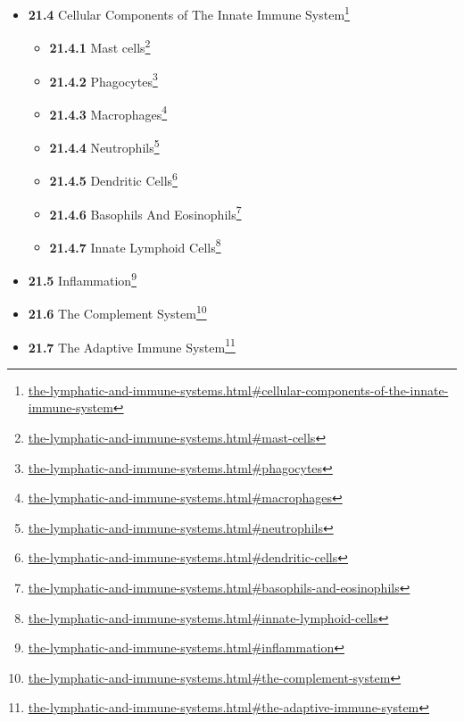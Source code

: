 \documentclass[
]{article}
\providecommand{\tightlist}{%
  \setlength{\itemsep}{0pt}\setlength{\parskip}{0pt}}
\providecommand{\tightlist}{%
  \setlength{\itemsep}{0pt}\setlength{\parskip}{0pt}}
\let\rmarkdownfootnote\footnote%
\def\footnote{\protect\rmarkdownfootnote}
\renewcommand{\href}[2]{#2\footnote{\url{#1}}}
\theoremstyle{definition}
\theoremstyle{definition}
\theoremstyle{definition}
\theoremstyle{remark}
\begin{document}
\begin{itemize}
\begin{itemize}
    \begin{itemize}
    \tightlist
    \item
      \href{the-lymphatic-and-immune-systems.html\#surface-barriers}{\emph{}\textbf{21.3.1}
      Surface Barriers}
    \end{itemize}
  \item
    \href{the-lymphatic-and-immune-systems.html\#cellular-components-of-the-innate-immune-system}{\emph{}\textbf{21.4}
    Cellular Components of The Innate Immune System}

    \begin{itemize}
    \tightlist
    \item
      \href{the-lymphatic-and-immune-systems.html\#mast-cells}{\emph{}\textbf{21.4.1}
      Mast cells}
    \item
      \href{the-lymphatic-and-immune-systems.html\#phagocytes}{\emph{}\textbf{21.4.2}
      Phagocytes}
    \item
      \href{the-lymphatic-and-immune-systems.html\#macrophages}{\emph{}\textbf{21.4.3}
      Macrophages}
    \item
      \href{the-lymphatic-and-immune-systems.html\#neutrophils}{\emph{}\textbf{21.4.4}
      Neutrophils}
    \item
      \href{the-lymphatic-and-immune-systems.html\#dendritic-cells}{\emph{}\textbf{21.4.5}
      Dendritic Cells}
    \item
      \href{the-lymphatic-and-immune-systems.html\#basophils-and-eosinophils}{\emph{}\textbf{21.4.6}
      Basophils And Eosinophils}
    \item
      \href{the-lymphatic-and-immune-systems.html\#innate-lymphoid-cells}{\emph{}\textbf{21.4.7}
      Innate Lymphoid Cells}
    \end{itemize}
  \item
    \href{the-lymphatic-and-immune-systems.html\#inflammation}{\emph{}\textbf{21.5}
    Inflammation}
  \item
    \href{the-lymphatic-and-immune-systems.html\#the-complement-system}{\emph{}\textbf{21.6}
    The Complement System}
  \item
    \href{the-lymphatic-and-immune-systems.html\#the-adaptive-immune-system}{\emph{}\textbf{21.7}
    The Adaptive Immune System}


\end{itemize}
\end{itemize}
\end{document}

